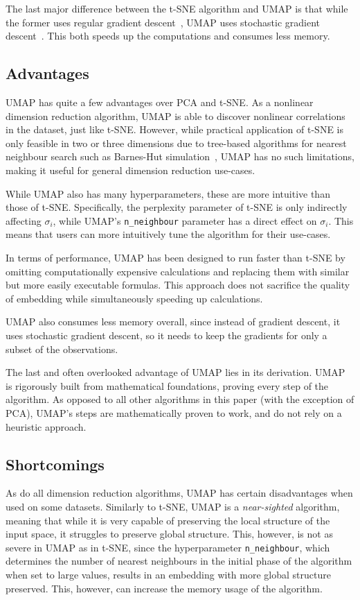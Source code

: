 The last major difference between the t-SNE algorithm and UMAP is that while the former uses regular gradient descent~\cite{bib:gd}, UMAP uses stochastic gradient descent~\cite{bib:sgd}. This both speeds up the computations and consumes less memory.

\subsection{Advantages}

UMAP has quite a few advantages over PCA and t-SNE. As a nonlinear dimension reduction algorithm, UMAP is able to discover nonlinear correlations in the dataset, just like t-SNE. However, while practical application of t-SNE is only feasible in two or three dimensions due to tree-based algorithms for nearest neighbour search such as Barnes-Hut simulation~\cite{bib:barnes-hut}, UMAP has no such limitations, making it useful for general dimension reduction use-cases.

While UMAP also has many hyperparameters, these are more intuitive than those of t-SNE. Specifically, the perplexity parameter of t-SNE is only indirectly affecting $\sigma_i$, while UMAP's \texttt{n\_neighbour} parameter has a direct effect on $\sigma_i$. This means that users can more intuitively tune the algorithm for their use-cases.

In terms of performance, UMAP has been designed to run faster than t-SNE by omitting computationally expensive calculations and replacing them with similar but more easily executable formulas. This approach does not sacrifice the quality of embedding while simultaneously speeding up calculations.

UMAP also consumes less memory overall, since instead of gradient descent, it uses stochastic gradient descent, so it needs to keep the gradients for only a subset of the observations.

The last and often overlooked advantage of UMAP lies in its derivation. UMAP is rigorously built from mathematical foundations, proving every step of the algorithm. As opposed to all other algorithms in this paper (with the exception of PCA), UMAP's steps are mathematically proven to work, and do not rely on a heuristic approach.

\subsection{Shortcomings}

As do all dimension reduction algorithms, UMAP has certain disadvantages when used on some datasets. Similarly to t-SNE, UMAP is a \textit{near-sighted} algorithm, meaning that while it is very capable of preserving the local structure of the input space, it struggles to preserve global structure. This, however, is not as severe in UMAP as in t-SNE, since the hyperparameter \texttt{n\_neighbour}, which determines the number of nearest neighbours in the initial phase of the algorithm when set to large values, results in an embedding with more global structure preserved. This, however, can increase the memory usage of the algorithm.


